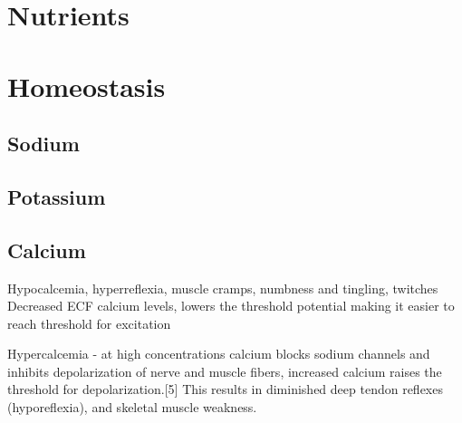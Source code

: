\section{Nutrients}

\section{Homeostasis}

\subsection{Sodium}

\subsection{Potassium}

\subsection{Calcium}

Hypocalcemia, hyperreflexia, muscle cramps, numbness and tingling, twitches
Decreased ECF calcium levels, lowers the threshold potential making it easier to reach threshold for excitation

Hypercalcemia - at high concentrations calcium blocks sodium channels and inhibits depolarization of nerve and muscle fibers, increased calcium raises the threshold for depolarization.[5] This results in diminished deep tendon reflexes (hyporeflexia), and skeletal muscle weakness.

\printbibliography[heading=subbibintoc]